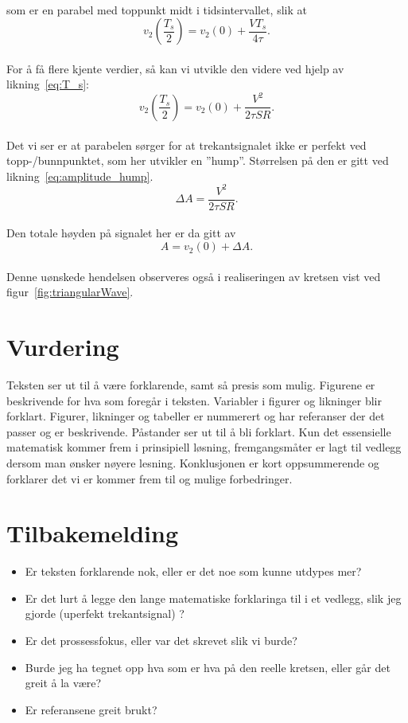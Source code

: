 \documentclass[a4paper,11pt,norsk]{article}
\begin{document}
\\
som er en parabel med toppunkt midt i tidsintervallet, slik at
\\
\begin{equation}
    v_2\left( \frac{T_s}{2} \right) = v_2(0) + \frac{VT_s}{4\tau} \textit{.}
\end{equation}
\\
For å få flere kjente verdier, så kan vi utvikle den videre ved hjelp av likning~\ref{eq:T_s}:
\begin{equation}
    v_2\left( \frac{T_s}{2} \right) = v_2(0) + \frac{V^2}{2\tau SR} \textit{.}
\end{equation}
\\
Det vi ser er at parabelen sørger for at trekantsignalet ikke er perfekt ved topp-/bunnpunktet, som  her utvikler en ''hump''. Størrelsen på den er gitt ved likning~\ref{eq:amplitude_hump}.
\\
\begin{equation}
    \Delta A = \frac{V^2}{2\tau SR} \textit{.}
    \label{eq:amplitude_hump}
\end{equation}
\\
Den totale høyden på signalet her er da gitt av
\\
\begin{equation}
    A = v_2(0) + \Delta A \textit{.}
    \label{eq:amplitude_total}
\end{equation}
\\
Denne uønskede hendelsen observeres også i realiseringen av kretsen vist ved  figur~\ref{fig:triangularWave}.
\section{Vurdering}
Teksten ser ut til å være forklarende, samt så presis som mulig.
Figurene er beskrivende for hva som foregår i teksten.
Variabler i figurer og likninger blir forklart.
Figurer, likninger og tabeller er nummerert og har referanser der det passer og er beskrivende.
Påstander ser ut til å bli forklart.
Kun det essensielle matematisk kommer frem i prinsipiell løsning, fremgangsmåter er lagt til vedlegg dersom man ønsker nøyere lesning.
Konklusjonen er kort oppsummerende og forklarer det vi er kommer frem til og mulige forbedringer.
\section{Tilbakemelding}
\begin{itemize}
    \item Er teksten forklarende nok, eller er det noe som kunne utdypes mer?
    \item Er det lurt å legge den lange matematiske forklaringa til i et vedlegg, slik jeg gjorde (uperfekt trekantsignal) ?
    \item Er det prossessfokus, eller var det skrevet slik vi burde?
    \item Burde jeg ha tegnet opp hva som er hva på den reelle kretsen, eller går det greit å la være?
    \item Er referansene greit brukt?
\end{itemize}
\end{document}
